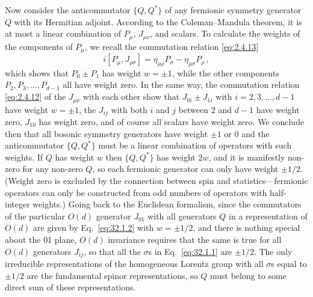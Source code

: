Now consider the anticommutator \(\{Q,Q^*\}\) of any fermionic symmetry
generator \(Q\) with its Hermitian adjoint. According to the
Coleman--Mandula theorem, it is at most a linear combination of \(P_\mu\),
\(J_{\mu\nu}\), and scalars. To calculate the weights of the components of
\(P_\mu\), we recall the commutation relation \eqref{eq:2.4.13}
\[
  i[P_\mu,J_{\rho\sigma}]
  =\eta_{\mu\rho}P_\sigma-\eta_{\mu\sigma}P_\rho\,,
\]
which shows that \(P_0\pm P_1\) has weight \(w=\pm1\), while the other
components \(P_2,P_3,\ldots,P_{d-1}\) all have weight zero. In the same
way, the commutation relation \eqref{eq:2.4.12} of the \(J_{\mu\nu}\) with
each other show that \(J_{0i}\pm J_{1i}\) with \(i=2,3,\ldots,d-1\) have
weight \(w=\pm1\), the \(J_{ij}\) with both \(i\) and \(j\) between 2 and
\(d-1\) have weight zero, \(J_{10}\) has weight zero, and of course all
scalars have weight zero. We conclude then that all bosonic symmetry
generators have weight \(\pm1\) or 0 and the anticommutator \(\{Q,Q^*\}\)
must be a linear combination of operators with such weights. If \(Q\) has
weight \(w\) then \(\{Q,Q^*\}\) has weight \(2w\), and it is manifestly
non-zero for any non-zero \(Q\), so each fermionic generator can only have
weight \(\pm1/2\). (Weight zero is excluded by the connection between spin
and statistics---fermionic operators can only be constructed from odd
numbers of operators with half-integer weights.) Going back to the
Euclidean formalism, since the commutators of the particular \(O(d)\)
generator \(J_{01}\) with all generators \(Q\) in a representation of
\(O(d)\) are given by Eq.~\eqref{eq:32.1.2} with \(w=\pm1/2\), and there
is nothing special about the 01 plane, \(O(d)\) invariance requires that
the same is true for all \(O(d)\) generators \(J_{ij}\), so that all the
\(\sigma\)s in Eq.~\eqref{eq:32.1.1} are \(\pm1/2\). The only irreducible
representations of the homogeneous Lorentz group with all \(\sigma\)s equal
to \(\pm1/2\) are the fundamental spinor representations, so \(Q\) must
belong to some direct sum of these representations.


